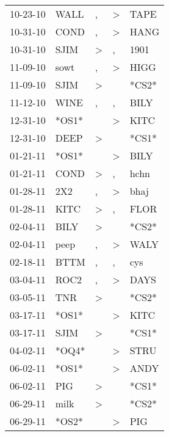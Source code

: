 \begin{supertabular}{lllll}
 10-23-10 &   WALL &                , &     \textgreater &   TAPE \\
 10-31-10 &   COND &                , &     \textgreater &   HANG \\
 10-31-10 &   SJIM &     \textgreater &                , &   1901 \\
 11-09-10 &   sowt &                , &     \textgreater &   HIGG \\
 11-09-10 &   SJIM &     \textgreater &                  &  *CS2* \\
 11-12-10 &   WINE &                , &                , &   BILY \\
 12-31-10 &  *OS1* &                  &     \textgreater &   KITC \\
 12-31-10 &   DEEP &     \textgreater &                  &  *CS1* \\
 01-21-11 &  *OS1* &                  &     \textgreater &   BILY \\
 01-21-11 &   COND &     \textgreater &                , &   hchn \\
 01-28-11 &    2X2 &                , &     \textgreater &   bhaj \\
 01-28-11 &   KITC &     \textgreater &                , &   FLOR \\
 02-04-11 &   BILY &     \textgreater &                  &  *CS2* \\
 02-04-11 &   peep &                , &     \textgreater &   WALY \\
 02-18-11 &   BTTM &                , &                , &    cys \\
 03-04-11 &   ROC2 &                , &     \textgreater &   DAYS \\
 03-05-11 &    TNR &     \textgreater &                  &  *CS2* \\
 03-17-11 &  *OS1* &                  &     \textgreater &   KITC \\
 03-17-11 &   SJIM &     \textgreater &                  &  *CS1* \\
 04-02-11 &  *OQ4* &                  &     \textgreater &   STRU \\
 06-02-11 &  *OS1* &                  &     \textgreater &   ANDY \\
 06-02-11 &    PIG &     \textgreater &                  &  *CS1* \\
 06-29-11 &   milk &     \textgreater &                  &  *CS2* \\
 06-29-11 &  *OS2* &                  &     \textgreater &    PIG \\

\end{supertabular}
